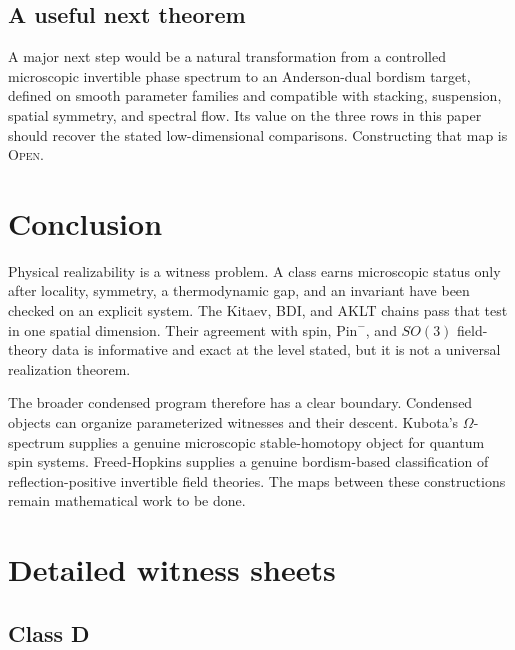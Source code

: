 \documentclass[12pt]{article}
\theoremstyle{definition}
\theoremstyle{remark}
\newcommand{\OPEN}{\textnormal{\textsc{Open}}}
\begin{document}
\subsection{A useful next theorem}

A major next step would be a natural transformation from a controlled
microscopic invertible phase spectrum to an Anderson-dual bordism target,
defined on smooth parameter families and compatible with stacking,
suspension, spatial symmetry, and spectral flow.  Its value on the three
rows in this paper should recover the stated low-dimensional comparisons.
Constructing that map is \OPEN{}.

\section{Conclusion}

Physical realizability is a witness problem.  A class earns microscopic
status only after locality, symmetry, a thermodynamic gap, and an invariant
have been checked on an explicit system.  The Kitaev, BDI, and AKLT chains
pass that test in one spatial dimension.  Their agreement with spin,
$\mathrm{Pin}^-$, and $SO(3)$ field-theory data is informative and exact at
the level stated, but it is not a universal realization theorem.

The broader condensed program therefore has a clear boundary.  Condensed
objects can organize parameterized witnesses and their descent.  Kubota's
$\Omega$-spectrum supplies a genuine microscopic stable-homotopy object for
quantum spin systems.  Freed-Hopkins supplies a genuine bordism-based
classification of reflection-positive invertible field theories.  The maps
between these constructions remain mathematical work to be done.

\appendix

\section{Detailed witness sheets}

\subsection{Class D}
\end{document}
